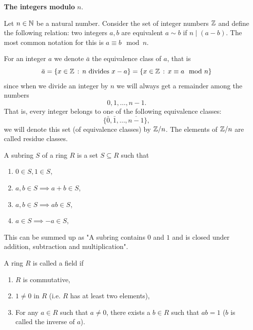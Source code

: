\documentclass[10pt, a4paper]{article}
\begin{document}
\textbf{The integers modulo} $n$.

Let $n \in \mathbb{N}$ be a natural number.
Consider the set of integer numbers $\mathbb{Z}$ and define the following relation:
two integers $a, b$ are equivalent $a \sim b$ if $n \mid (a - b)$.
The most common notation for this is $a \equiv b \mod n$.

For an integer $a$ we denote $\bar{a}$ the equivalence class of $a$,
that is
\[
\bar{a} = \{x \in \mathbb{Z}\,:\, n\text{ divides } x - a\} = \{x \in \mathbb{Z}\,:\, x \equiv a\mod n\}
\]
since when we divide an integer by $n$ we will always get a remainder among the numbers
\[
0, 1, \dotsc, n - 1.
\]
That is,
every integer belongs to one of the following equivalence classes:
\[
\{\bar{0}, \bar{1}, \dotsc, \overline{n - 1}\},
\]
we will denote this set
(of equivalence classes)
by $\mathbb{Z} / n$.
The elements of $\mathbb{Z} / n$ are called residue classes.

\begin{definition}[Subring]
    A subring $S$ of a ring $R$ is a set $S \subseteq R$ such that
    \begin{enumerate}[label = \roman*)]
        \item $0 \in S, 1 \in S$,

        \item $a, b \in S \implies a + b \in S$,
        
        \item $a, b \in S \implies ab \in S$,
        
        \item $a \in S \implies -a \in S$,
    \end{enumerate}
\end{definition}
This can be summed up as "A subring contains $0$ and $1$ and is closed under addition,
subtraction and multiplication".

\begin{definition}[Field]
    A ring $R$ is called a field if
    
    \begin{enumerate}[label = \roman*)]
        \item $R$ is commutative,

        \item $1 \neq 0$ in $R$
        (i.e. $R$ has at least two elements),


        \item For any $a \in R$ such that $a \neq 0$,
        there exists a $b \in R$ such that $ab = 1$
        ($b$ is called the inverse of $a$).
    \end{enumerate}
\end{definition}
\end{document}
